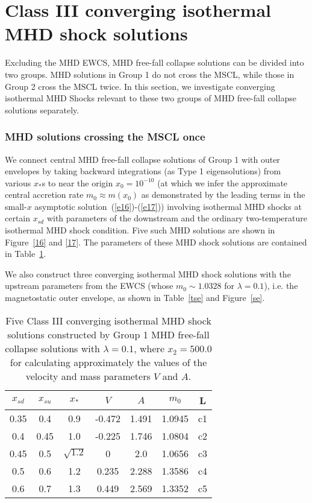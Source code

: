 \documentclass[fleqn,usenatbib]{mnras}
\begin{document}
\section{Class III converging isothermal MHD shock solutions}
\label{a4}


Excluding the MHD EWCS, MHD free-fall collapse solutions can be divided into two groups. MHD solutions in Group 1 do not cross the MSCL, while those in Group 2 cross the MSCL twice. In this section, we investigate converging isothermal MHD Shocks relevant to these two groups of MHD free-fall collapse solutions separately.  

\subsubsection{MHD solutions crossing the MSCL once}
\label{s5.3.1}
We connect central MHD free-fall collapse solutions of Group 1 with outer envelopes by taking backward integrations (as Type 1 eigensolutions) from various $x_{*}$s to near the origin $x_{0}=10^{-10}$ (at which we infer the approximate central accretion rate $m_{0}\approx m(x_{0})$ as demonstrated by the leading terms in the small-$x$ asymptotic solution~(\ref{e16})-(\ref{e17})) involving isothermal MHD shocks at certain $x_{sd}$ with parameters of the downstream and the ordinary two-temperature isothermal MHD shock condition. Five such MHD solutions are shown in Figure~\ref{16} and \ref{17}. The parameters of these MHD shock solutions are contained in Table~\ref{t4}.

We also construct three converging isothermal MHD shock solutions with the upstream parameters from the EWCS (whose $m_{0}\sim 1.0328$ for $\lambda=0.1$), i.e. the magnetostatic outer envelope, as shown in Table~\ref{tse} and Figure~\ref{se}. 

\begin{table}
\centering
\caption{Five Class III converging isothermal MHD shock solutions constructed by Group 1 MHD free-fall collapse solutions with $\lambda=0.1$, where $x_{2}=500.0$ for calculating approximately the values of the velocity and mass parameters $V$ and $A$.}
\begin{tabular}{ccccccc}
\hline
$x_{sd}$ & $x_{su}$ & $x_{*}$ & $V$ & $A$ & $m_{0}$ & L\\
\hline
0.35 & 0.4 & 0.9 & -0.472 & 1.491 & 1.0945 & c1\\
0.4 & 0.45 & 1.0 & -0.225 & 1.746 & 1.0804 & c2\\
0.45 & 0.5 & $\sqrt{1.2}$ & 0 & 2.0 & 1.0656 & c3\\
0.5 & 0.6 & 1.2 & 0.235 & 2.288 & 1.3586 & c4\\
0.6 & 0.7 & 1.3 & 0.449 & 2.569 & 1.3352 & c5\\
\hline
\end{tabular}
\label{t4}
\end{table}
\end{document}
